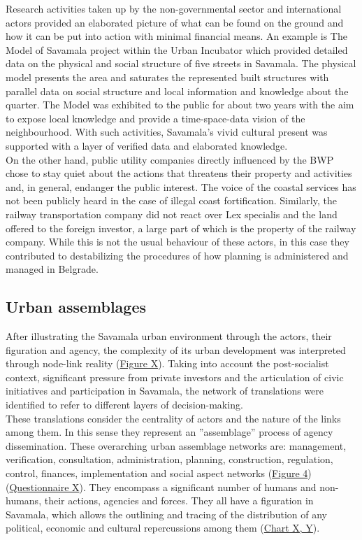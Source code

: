 \documentclass[11pt]{report}
\begin{document}
{{{{Research activities taken up by the non-governmental sector and international actors provided an elaborated picture of what can be found on the ground and how it can be put into action with minimal financial means. An example is The Model of Savamala project within the Urban Incubator which provided detailed data on the physical and social structure of five streets in Savamala. The physical model presents the area and saturates the represented built structures with parallel data on social structure and local information and knowledge about the quarter. The Model was exhibited to the public for about two years with the aim to expose local knowledge and provide a time-space-data vision of the neighbourhood. With such activities, Savamala’s vivid cultural present was supported with a layer of verified data and elaborated knowledge.
\\

On the other hand, public utility companies directly influenced by the BWP chose to stay quiet about the actions that threatens their  property  and  activities  and, in general,  endanger the public interest. The voice of the coastal services has not been publicly heard in the case of illegal coast fortification. Similarly, the railway transportation company did not react over Lex specialis and the land offered to the foreign investor, a large part of which is the property of the railway company. While this is not the usual behaviour of these actors, in this case they contributed to destabilizing the procedures of how planning is administered and managed in Belgrade.

\subsection{Urban assemblages}

After illustrating the Savamala urban environment through the actors, their figuration and agency, the complexity of its urban development was interpreted through node-link reality (\href{Figure 8}{Figure X}).
Taking into account the post-socialist context, significant pressure from private investors and the articulation of civic initiatives and participation in Savamala, the network of translations were identified to refer to different layers of decision-making.
\\

These translations consider the centrality of actors and the nature of the links among them. In this sense they represent an ”assemblage” process of agency dissemination. These overarching urban assemblage networks are: management, verification, consultation, administration, planning, construction, regulation, control, finances, implementation and social aspect networks (\href{ref}{Figure 4}) (\href{Questionnaire Experts Post-socialist}{Questionnaire X}).
They encompass a significant number of humans and non-humans, their actions, agencies and forces. They all have a figuration in Savamala, which allows the outlining and tracing of the distribution of any political, economic and cultural repercussions among them (\href{Table 5 and 6 Mira charts}{Chart X, Y}).
\\ 

}}}}
\end{document}
